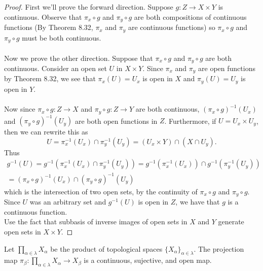 \documentclass[letter,12pt,twoside]{hmcpset}
\begin{document}
\begin{proof}
    First we'll prove the forward direction. Suppose $g: Z \rightarrow X
    \times Y$ is continuous. Observe that $\pi_x \circ g$ and $\pi_y
    \circ g$ are both compositions of continuous functions (By Theorem
    8.32, $\pi_x$ and $\pi_y$ are continuous functions) so $\pi_x \circ g$ and $\pi_y
    \circ g$ must be both continuous. 
    \\
    \\
    Now we prove the other direction. Suppose that $\pi_x \circ g$ and
    $\pi_y \circ g$ are both continuous. Consider an open set $U$ in
    $X \times Y$. Since $\pi_x$ and $\pi_y$ are open functions by
    Theorem 8.32, we see that $\pi_x(U) = U_x$ is open in $X$ and
    $\pi_y(U) = U_y$ is open in $Y$.
    \\
    \\
    Now since $\pi_x \circ g: Z \rightarrow X$ and $\pi_y \circ g : Z
    \rightarrow Y$ are both continuous, $(\pi_x \circ g)^{-1}(U_x)$
    and $(\pi_y \circ g)^{-1}(U_y)$ are both open functions in $Z$. 
    Furthermore, if $U = U_x \times U_y$, then we can rewrite this as 
    \[
        U = \pi^{-1}_x(U_x) \cap \pi^{-1}_y(U_y) = (U_x \times Y) \cap (X \cap U_y).
    \]
    Thus 
    \begin{align*}
       g^{-1}(U) = g^{-1}(\pi^{-1}_x(U_x) \cap \pi^{-1}_y(U_y))
        =  g^{-1}(\pi^{-1}_x(U_x)) \cap g^{-1}(\pi^{-1}_y(U_y))
        \\
        =  (\pi_x \circ g)^{-1}(U_x) \cap (\pi_y \circ g)^{-1}(U_y) 
    \end{align*}
    which is the intersection of two open sets, by the continuity of
    $\pi_x \circ g$ and $\pi_y \circ g$. Since $U$ was an arbitrary
    set and $g^{-1}(U)$ is open in $Z$, we have that $g$ is a
    continuous function.
    \\
    Use the fact that subbasis of inverse images of open sets in $X$
    and $Y$ generate open sets in $X \times Y$.
    
\end{proof}

\begin{problem}[Theorem 8.38]
    Let $\prod\limits_{\alpha \in \lambda}X_\alpha$ be the product of
    topological spaces $\{X_\alpha\}_{\alpha \in \lambda}$. The
    projection map $\pi_\beta :\prod\limits_{\alpha \in
    \lambda}X_\alpha \to X_\beta $ is a continuous, sujective, and
    open map.
\end{problem}
\end{document}
